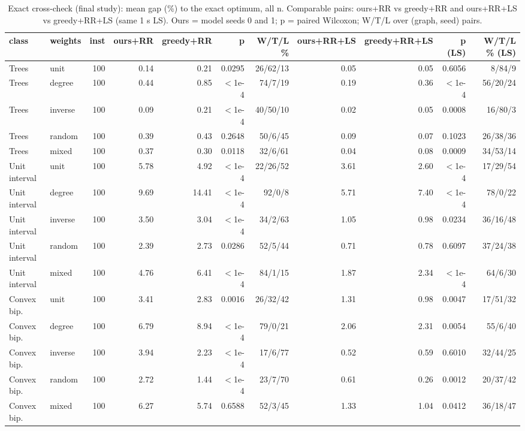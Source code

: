 \begin{table}[t]
\centering
\caption{Exact cross-check (final study): mean gap (\%) to the exact optimum, all n. Comparable pairs: ours+RR vs greedy+RR and ours+RR+LS vs greedy+RR+LS (same 1 s LS). Ours = model seeds 0 and 1; p = paired Wilcoxon; W/T/L over (graph, seed) pairs.}
\label{tab:exact_fair_final}
\scriptsize
\begin{tabular}{llrrrrrrrrr}
\toprule
class & weights & inst & ours+RR & greedy+RR & p & W/T/L \% & ours+RR+LS & greedy+RR+LS & p (LS) & W/T/L \% (LS) \\
\midrule
Trees & unit & 100 & 0.14 & 0.21 & 0.0295 & 26/62/13 & 0.05 & 0.05 & 0.6056 & 8/84/9 \\
Trees & degree & 100 & 0.44 & 0.85 & $<$1e-4 & 74/7/19 & 0.19 & 0.36 & $<$1e-4 & 56/20/24 \\
Trees & inverse & 100 & 0.09 & 0.21 & $<$1e-4 & 40/50/10 & 0.02 & 0.05 & 0.0008 & 16/80/3 \\
Trees & random & 100 & 0.39 & 0.43 & 0.2648 & 50/6/45 & 0.09 & 0.07 & 0.1023 & 26/38/36 \\
Trees & mixed & 100 & 0.37 & 0.30 & 0.0118 & 32/6/61 & 0.04 & 0.08 & 0.0009 & 34/53/14 \\
Unit interval & unit & 100 & 5.78 & 4.92 & $<$1e-4 & 22/26/52 & 3.61 & 2.60 & $<$1e-4 & 17/29/54 \\
Unit interval & degree & 100 & 9.69 & 14.41 & $<$1e-4 & 92/0/8 & 5.71 & 7.40 & $<$1e-4 & 78/0/22 \\
Unit interval & inverse & 100 & 3.50 & 3.04 & $<$1e-4 & 34/2/63 & 1.05 & 0.98 & 0.0234 & 36/16/48 \\
Unit interval & random & 100 & 2.39 & 2.73 & 0.0286 & 52/5/44 & 0.71 & 0.78 & 0.6097 & 37/24/38 \\
Unit interval & mixed & 100 & 4.76 & 6.41 & $<$1e-4 & 84/1/15 & 1.87 & 2.34 & $<$1e-4 & 64/6/30 \\
Convex bip. & unit & 100 & 3.41 & 2.83 & 0.0016 & 26/32/42 & 1.31 & 0.98 & 0.0047 & 17/51/32 \\
Convex bip. & degree & 100 & 6.79 & 8.94 & $<$1e-4 & 79/0/21 & 2.06 & 2.31 & 0.0054 & 55/6/40 \\
Convex bip. & inverse & 100 & 3.94 & 2.23 & $<$1e-4 & 17/6/77 & 0.52 & 0.59 & 0.6010 & 32/44/25 \\
Convex bip. & random & 100 & 2.72 & 1.44 & $<$1e-4 & 23/7/70 & 0.61 & 0.26 & 0.0012 & 20/37/42 \\
Convex bip. & mixed & 100 & 6.27 & 5.74 & 0.6588 & 52/3/45 & 1.33 & 1.04 & 0.0412 & 36/18/47 \\

\end{tabular}
\end{table}
